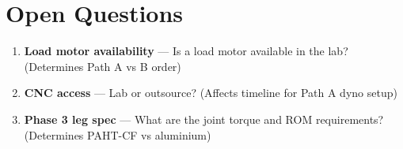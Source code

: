 \documentclass[11pt]{article}
\begin{document}
\section*{Open Questions}
\begin{enumerate}[noitemsep, topsep=0pt]
    \item \textbf{Load motor availability} — Is a load motor available in the lab? (Determines Path A vs B order)
    \item \textbf{CNC access} — Lab or outsource? (Affects timeline for Path A dyno setup)
    \item \textbf{Phase 3 leg spec} — What are the joint torque and ROM requirements? (Determines PAHT-CF vs aluminium)
\end{enumerate}
\end{document}
